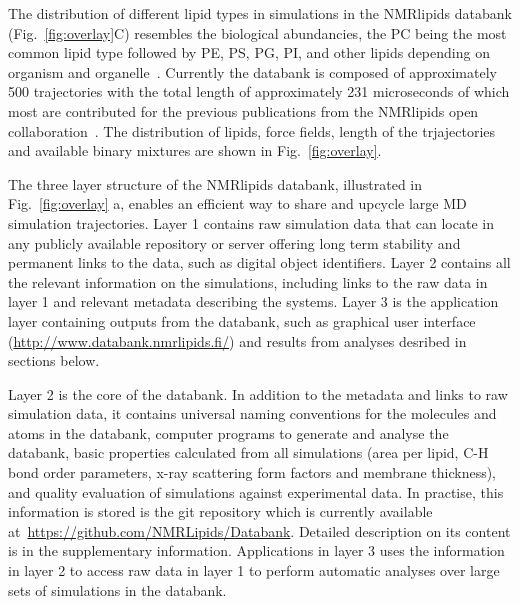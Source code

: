 \documentclass[fleqn,10pt]{wlscirep}
\begin{document}
The distribution of different lipid types in simulations in the NMRlipids databank (Fig.~\ref{fig:overlay}C) resembles the biological abundancies, the PC being the most common lipid type followed by PE, PS, PG, PI, and other lipids depending on organism and organelle~\cite{vanmeer08}. 
Currently the databank is composed of approximately 500 trajectories with the total length of approximately 231 microseconds of which most are contributed for the previous publications from the NMRlipids open collaboration~\cite{botan15,catte16,antila19,bacle21}. The distribution of lipids, force fields, length of the trjajectories and available binary mixtures are shown in Fig.~\ref{fig:overlay}. 


The three layer structure of the NMRlipids databank, illustrated in Fig.~\ref{fig:overlay} a, enables an efficient way to share and upcycle large MD simulation trajectories.  Layer 1 contains raw simulation data that can locate in any publicly available repository or server offering long term stability and permanent links to the data, such as digital object identifiers. Layer 2 contains all the relevant information on the simulations, including links to the raw data in layer 1 and relevant metadata describing the systems. Layer 3 is the application layer containing outputs from the databank, such as graphical user interface (\url{http://www.databank.nmrlipids.fi/}) and results from analyses desribed in sections below.   

Layer 2 is the core of the databank. In addition to the metadata and links to raw simulation data, it contains universal naming conventions for the molecules and atoms in the databank, computer programs to generate and analyse the databank, basic properties calculated from all simulations (area per lipid, C-H bond order parameters, x-ray scattering form factors and membrane thickness), and quality evaluation of simulations against experimental data. In practise, this information is stored is the git repository which is currently available at~\url{https://github.com/NMRLipids/Databank}.
Detailed description on its content is in the supplementary information. Applications in layer 3 uses the information in layer 2 to access raw data in layer 1 to perform automatic analyses over large sets of simulations in the databank. 

\end{document}
